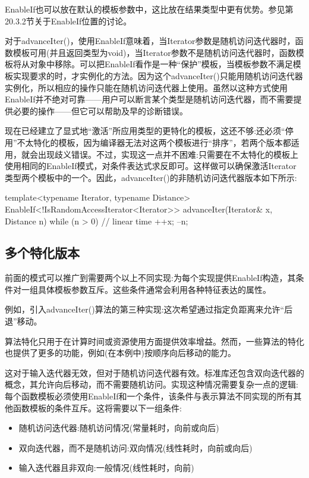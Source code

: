 \begin{notice}
EnableIf也可以放在默认的模板参数中，这比放在结果类型中更有优势。参见第20.3.2节关于EnableIf位置的讨论。
\end{notice}

对于advanceIter()，使用EnableIf意味着，当Iterator参数是随机访问迭代器时，函数模板可用(并且返回类型为void)，当Iterator参数不是随机访问迭代器时，函数模板将从对象中移除。可以把EnableIf看作是一种“保护”模板，当模板参数不满足模板实现要求的时，才实例化的方法。因为这个advanceIter()只能用随机访问迭代器实例化，所以相应的操作只能在随机访问迭代器上使用。虽然以这种方式使用EnableIf并不绝对可靠——用户可以断言某个类型是随机访问迭代器，而不需要提供必要的操作——但它可以帮助及早的诊断错误。

现在已经建立了显式地“激活”所应用类型的更特化的模板，这还不够:还必须“停用”不太特化的模板，因为编译器无法对这两个模板进行“排序”，若两个版本都适用，就会出现歧义错误。不过，实现这一点并不困难:只需要在不太特化的模板上使用相同的EnableIf模式，对条件表达式求反即可。这样做可以确保激活Iterator类型两个模板中的一个。因此，advanceIter()的非随机访问迭代器版本如下所示:

\begin{cpp}
template<typename Iterator, typename Distance>
EnableIf<!IsRandomAccessIterator<Iterator>>
advanceIter(Iterator& x, Distance n)
{
	while (n > 0) { // linear time
		++x;
		--n;
	}
}
\end{cpp}

\subsection{多个特化版本}

前面的模式可以推广到需要两个以上不同实现:为每个实现提供EnableIf构造，其条件对一组具体模板参数互斥。这些条件通常会利用各种特征表达的属性。

例如，引入advanceIter()算法的第三种实现:这次希望通过指定负距离来允许“后退”移动。

\begin{notice}
算法特化只用于在计算时间或资源使用方面提供效率增益。然而，一些算法的特化也提供了更多的功能，例如(在本例中)按顺序向后移动的能力。
\end{notice}

这对于输入迭代器无效，但对于随机访问迭代器有效。标准库还包含双向迭代器的概念，其允许向后移动，而不需要随机访问。实现这种情况需要复杂一点的逻辑:每个函数模板必须使用EnableIf和一个条件，该条件与表示算法不同实现的所有其他函数模板的条件互斥。这将需要以下一组条件:

\begin{itemize}
\item 
随机访问迭代器:随机访问情况(常量耗时，向前或向后)

\item
双向迭代器，而不是随机访问:双向情况(线性耗时，向前或向后)

\item
输入迭代器且非双向:一般情况(线性耗时，向前)
\end{itemize}

